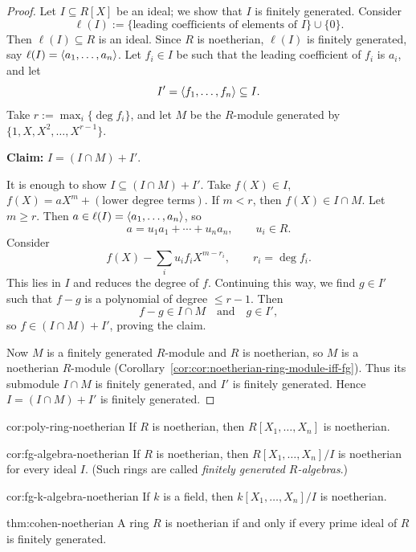 \begin{proof}
Let $I \subseteq R[X]$ be an ideal; we show that $I$ is finitely generated. Consider
\[
\ell(I) := \{\text{leading coefficients of elements of } I\} \cup \{0\}.
\]
Then $\ell(I) \subseteq R$ is an ideal. Since $R$ is noetherian, $\ell(I)$ is finitely generated, say $\ell(I) = \langle a_1, \ldots, a_n \rangle$. Let $f_i \in I$ be such that the leading coefficient of $f_i$ is $a_i$, and let
\[
I' = \langle f_1, \ldots, f_n \rangle \subseteq I.
\]
Take $r := \max_i \{\deg f_i\}$, and let $M$ be the $R$-module generated by $\{1, X, X^2, \ldots, X^{r-1}\}$.

\textbf{Claim:} $I = (I \cap M) + I'$.

It is enough to show $I \subseteq (I \cap M) + I'$. Take $f(X) \in I$, $f(X) = aX^m + (\text{lower degree terms})$. If $m < r$, then $f(X) \in I \cap M$. Let $m \geq r$. Then $a \in \ell(I) = \langle a_1, \ldots, a_n \rangle$, so
\[
a = u_1a_1 + \cdots + u_na_n, \qquad u_i \in R.
\]
Consider
\[
f(X) - \sum_i u_if_i X^{m - r_i}, \qquad r_i = \deg f_i.
\]
This lies in $I$ and reduces the degree of $f$. Continuing this way, we find $g \in I'$ such that $f - g$ is a polynomial of degree $\leq r - 1$. Then
\[
f - g \in I \cap M \quad\text{and}\quad g \in I',
\]
so $f \in (I \cap M) + I'$, proving the claim.

Now $M$ is a finitely generated $R$-module and $R$ is noetherian, so $M$ is a noetherian $R$-module (Corollary~\ref{cor:cor:noetherian-ring-module-iff-fg}). Thus its submodule $I \cap M$ is finitely generated, and $I'$ is finitely generated. Hence $I = (I \cap M) + I'$ is finitely generated.
\end{proof}

\begin{corollary}{}{cor:poly-ring-noetherian}
If $R$ is noetherian, then $R[X_1, \ldots, X_n]$ is noetherian.
\end{corollary}

\begin{corollary}{}{cor:fg-algebra-noetherian}
If $R$ is noetherian, then $R[X_1, \ldots, X_n]/I$ is noetherian for every ideal $I$. (Such rings are called \emph{finitely generated $R$-algebras}.)
\end{corollary}

\begin{corollary}{}{cor:fg-k-algebra-noetherian}
If $k$ is a field, then $k[X_1, \ldots, X_n]/I$ is noetherian.
\end{corollary}

\begin{theorem}{}{thm:cohen-noetherian}
A ring $R$ is noetherian if and only if every prime ideal of $R$ is finitely generated.
\end{theorem}

